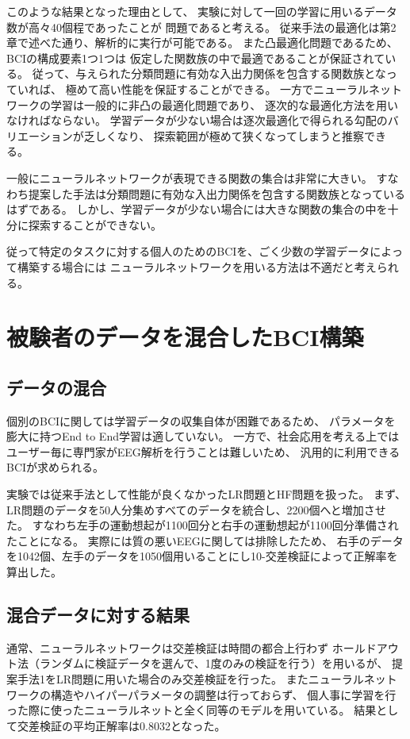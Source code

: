 このような結果となった理由として、
実験に対して一回の学習に用いるデータ数が高々40個程であったことが
問題であると考える。
従来手法の最適化は第2章で述べた通り、解析的に実行が可能である。
また凸最適化問題であるため、BCIの構成要素1つ1つは
仮定した関数族の中で最適であることが保証されている。
従って、与えられた分類問題に有効な入出力関係を包含する関数族となっていれば、
極めて高い性能を保証することができる。
一方でニューラルネットワークの学習は一般的に非凸の最適化問題であり、
逐次的な最適化方法を用いなければならない。
学習データが少ない場合は逐次最適化で得られる勾配のバリエーションが乏しくなり、
探索範囲が極めて狭くなってしまうと推察できる。

一般にニューラルネットワークが表現できる関数の集合は非常に大きい。
すなわち提案した手法は分類問題に有効な入出力関係を包含する関数族となっているはずである。
しかし、学習データが少ない場合には大きな関数の集合の中を十分に探索することができない。

従って特定のタスクに対する個人のためのBCIを、ごく少数の学習データによって構築する場合には
ニューラルネットワークを用いる方法は不適だと考えられる。

\section{\mc 被験者のデータを混合したBCI構築}
\subsection{\mc データの混合}
個別のBCIに関しては学習データの収集自体が困難であるため、
パラメータを膨大に持つEnd to End学習は適していない。
一方で、社会応用を考える上ではユーザー毎に専門家がEEG解析を行うことは難しいため、
汎用的に利用できるBCIが求められる。

実験では従来手法として性能が良くなかったLR問題とHF問題を扱った。
まず、LR問題のデータを50人分集めすべてのデータを統合し、2200個へと増加させた。
すなわち左手の運動想起が1100回分と右手の運動想起が1100回分準備されたことになる。
実際には質の悪いEEGに関しては排除したため、
右手のデータを1042個、左手のデータを1050個用いることにし10-交差検証によって正解率を算出した。

\subsection{\mc 混合データに対する結果}
通常、ニューラルネットワークは交差検証は時間の都合上行わず
ホールドアウト法（ランダムに検証データを選んで、1度のみの検証を行う）を用いるが、
提案手法1をLR問題に用いた場合のみ交差検証を行った。
またニューラルネットワークの構造やハイパーパラメータの調整は行っておらず、
個人事に学習を行った際に使ったニューラルネットと全く同等のモデルを用いている。
結果として交差検証の平均正解率は0.8032となった。

